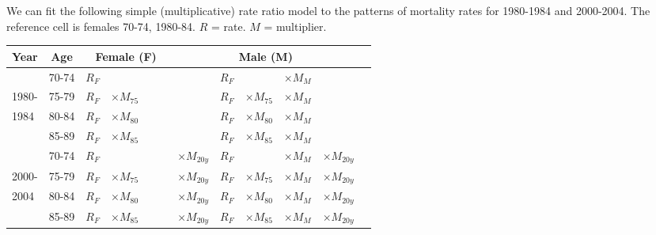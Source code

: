 \documentclass[10pt]{beamer}\usepackage[]{graphicx}\usepackage[]{color}
\begin{document}
\begin{frame}
\tiny
\vspace*{-0.1in}
We can fit the following simple (multiplicative) rate ratio model to the patterns of mortality rates  for 1980-1984 and  2000-2004. The reference cell is females 70-74, 1980-84. $R$ = rate. $M$ = multiplier.

\begin{tabular}{|l c | l l  l  l  | l l l l | l |}
	\hline
	Year  & Age & \multicolumn{3}{c}{Female (F)} & &   \multicolumn{3}{c}{Male (M)} & \\ 
	\hline
	& 70-74 &  $R_{F}$ & & & & $R_{F}$ & & $\times M_{M}$  & \\
	1980- & 75-79 &  $R_{F}$ & $ \times M_{75}$ & &   & $R_{F}$ & $\times M_{75}$ & $\times M_{M}$ & \\
	1984 & 80-84 & $R_{F}$ & $ \times M_{80}$ &  & &  $R_{F}$ & $ \times M_{80}$ & $ \times M_{M}$ & \\
	& 85-89 & $R_{F}$ & $ \times M_{85}$ &  & &  $R_{F}$ & $ \times M_{85}$ & $ \times M_{M}$ & \\ 
	\hline
	& 70-74 &  $R_{F}$ &  & & $\times M_{20y}$  &  $R_{F}$ & & $  \times M_{M}$  & $\times M_{20y}$\\
	2000- & 75-79 &  $R_{F} $ & $\times M_{75}$ & & $\times M_{20y}$ &  $R_{F}$ & $ \times M_{75}$ & $ \times M_{M}$& $\times M_{20y}$ \\
	2004      & 80-84 & $R_{F}$ & $ \times M_{80}$ & & $\times M_{20y}$ &   $R_{F}$ & $ \times M_{80}$ & $ \times M_{M}$ & $\times M_{20y}$ \\
	& 85-89 & $R_{F}$ & $ \times M_{85}$ & \ \ \ & $\times M_{20y}$&   $R_{F}$ & $\times M_{85}$ & $\times M_{M}$ & $\times M_{20y}$ \\
	\hline
\end{tabular}



\end{frame}
\end{document}

